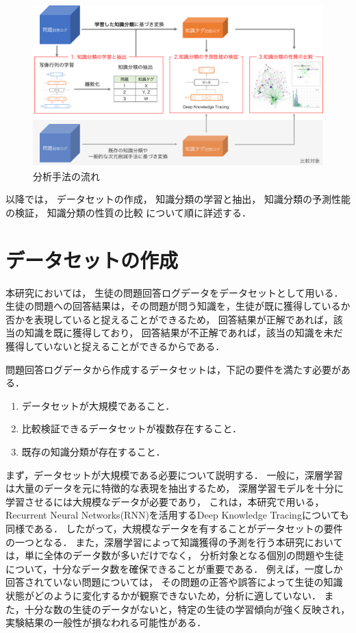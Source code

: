 \begin{figure}[htb]
\begin{center}
\includegraphics[width=400pt]{./img/workflow4.pdf}
\end{center}
\caption{分析手法の流れ}
\label{fig:workflow}
\end{figure}

以降では，
データセットの作成，
知識分類の学習と抽出，
知識分類の予測性能の検証，
知識分類の性質の比較
について順に詳述する．


\section{データセットの作成}
本研究においては，
生徒の問題回答ログデータをデータセットとして用いる．
生徒の問題への回答結果は，その問題が問う知識を，生徒が既に獲得しているか否かを表現していると捉えることができるため，
回答結果が正解であれば，該当の知識を既に獲得しており，
回答結果が不正解であれば，該当の知識を未だ獲得していないと捉えることができるからである．

問題回答ログデータから作成するデータセットは，下記の要件を満たす必要がある．
\begin{enumerate}
	\item データセットが大規模であること．
	\item 比較検証できるデータセットが複数存在すること．
	\item 既存の知識分類が存在すること．
\end{enumerate}


まず，データセットが大規模である必要について説明する．
一般に，深層学習は大量のデータを元に特徴的な表現を抽出するため，
深層学習モデルを十分に学習させるには大規模なデータが必要であり，
これは，本研究で用いる，Recurrent Neural Networks(RNN)を活用するDeep Knowledge Tracingについても同様である\cite{piech2015deep}．
したがって，大規模なデータを有することがデータセットの要件の一つとなる．
また，深層学習によって知識獲得の予測を行う本研究においては，単に全体のデータ数が多いだけでなく，
分析対象となる個別の問題や生徒について，十分なデータ数を確保できることが重要である．
例えば，一度しか回答されていない問題については，
その問題の正答や誤答によって生徒の知識状態がどのように変化するかが観察できないため，分析に適していない．
また，十分な数の生徒のデータがないと，特定の生徒の学習傾向が強く反映され，
実験結果の一般性が損なわれる可能性がある．


